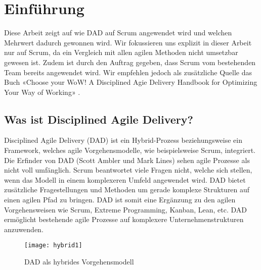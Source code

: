 
\chapter{Einführung}
\thispagestyle{fancy}
Diese Arbeit zeigt auf wie DAD auf Scrum angewendet wird und welchen Mehrwert dadurch gewonnen wird. Wir fokussieren uns explizit in dieser Arbeit nur auf Scrum, da ein Vergleich mit allen agilen Methoden nicht umsetzbar gewesen ist. Zudem ist durch den Auftrag gegeben, dass Scrum vom bestehenden Team bereits angewendet wird.
Wir empfehlen jedoch als zusätzliche Quelle das Buch «Choose your WoW! A Disciplined Agie Delivery Handbook for Optimizing Your Way of Working» \cite{dadHandbook}.

\section{Was ist Disciplined Agile Delivery?}

Disciplined Agile Delivery (DAD) ist ein Hybrid-Prozess beziehungsweise ein Framework, welches agile Vorgehensmodelle, wie beispielsweise Scrum, integriert. Die Erfinder von DAD (Scott Ambler und Mark Lines) sehen agile Prozesse als nicht voll umfänglich. Scrum beantwortet viele Fragen nicht, welche sich stellen, wenn das Modell in einem komplexeren Umfeld angewendet wird. DAD bietet zusätzliche Fragestellungen und Methoden um gerade komplexe Strukturen auf einen agilen Pfad zu bringen. DAD ist somit eine Ergänzung zu den agilen Vorgehensweisen wie Scrum, Extreme Programming, Kanban, Lean, etc. DAD ermöglicht bestehende agile Prozesse auf komplexere Unternehmenstrukturen anzuwenden.\newline

\begin{figure}[H]
	\centering
	\texttt{[image: hybrid1]}
	\caption{DAD als hybrides Vorgehensmodell \cite{dadHybrid}}
	\label{fig:hybrid}
\end{figure}
